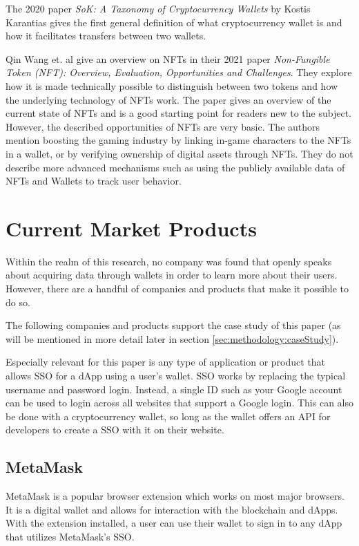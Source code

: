 The 2020 paper \textit{SoK: A Taxonomy of Cryptocurrency Wallets} by Kostis Karantias gives the first general definition of what cryptocurrency wallet is and how it facilitates transfers between two wallets. \cite{wallets1}

Qin Wang et. al give an overview on NFTs in their 2021 paper \textit{Non-Fungible Token (NFT): Overview, Evaluation, Opportunities and Challenges}. They explore how it is made technically possible to distinguish between two tokens and how the underlying technology of NFTs work. The paper gives an overview of the current state of NFTs and is a good starting point for readers new to the subject. However, the described opportunities of NFTs are very basic. The authors mention boosting the gaming industry by linking in-game characters to the NFTs in a wallet, or by verifying ownership of digital assets through NFTs. They do not describe more advanced mechanisms such as using the publicly available data of NFTs and Wallets to track user behavior.



%
%
\section{Current Market Products}
\label{sec:sota:products}
Within the realm of this research, no company was found that openly speaks about acquiring data through wallets in order to learn more about their users. However, there are a handful of companies and products that make it possible to do so.

The following companies and products support the case study  of this paper (as will be mentioned in more detail later in section \ref{sec:methodology:caseStudy}).

Especially relevant for this paper is any type of application or product that allows SSO for a dApp using a user's wallet. SSO works by replacing the typical username and password login. Instead, a single ID such as your Google account can be used to login across all websites that support a Google login. This can also be done with a cryptocurrency wallet, so long as the wallet offers an API for developers to create a SSO with it on their website.

\subsection{MetaMask}
\label{sec:sota:metaMask}
MetaMask is a popular browser extension which works on most major browsers. It is a digital wallet and allows for interaction with the blockchain and dApps. With the extension installed, a user can use their wallet to sign in to any dApp that utilizes MetaMask's SSO. \cite{metaMask}

